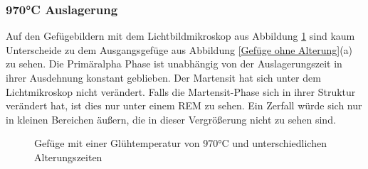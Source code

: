 \documentclass[a4paper, 11pt]{tubsreprt}
\begin{document}
\subsubsection{970°C Auslagerung}
Auf den Gefügebildern mit dem Lichtbildmikroskop aus Abbildung \ref{970 alterung} sind kaum Unterscheide zu dem Ausgangsgefüge aus Abbildung \ref{Gefüge ohne Alterung}(a) zu sehen. Die Primäralpha Phase ist unabhängig von der Auslagerungszeit in ihrer Ausdehnung konstant geblieben. Der Martensit hat sich unter dem Lichtmikroskop nicht verändert. Falls die Martensit-Phase sich in ihrer Struktur verändert hat, ist dies nur unter einem REM zu sehen. Ein Zerfall würde sich nur in kleinen Bereichen äußern, die in dieser Vergrößerung nicht zu sehen sind. 

\begin{figure} 		%
    \caption{Gefüge mit einer Glühtemperatur von 970°C und unterschiedlichen Alterungszeiten}
    \label{970 alterung}
\end{figure}
\end{document}

